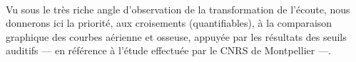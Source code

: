 \\
Vu sous le très riche angle d'observation de la transformation de l'écoute, 
nous
donnerons ici la priorité, aux croisements (quantifiables), à la comparaison graphique
des courbes aérienne et osseuse, appuyée  par les résultats
des seuils auditifs --- en référence à
  l'étude effectuée par le CNRS de Montpellier\autocite{affectiveDisorders} ---.
